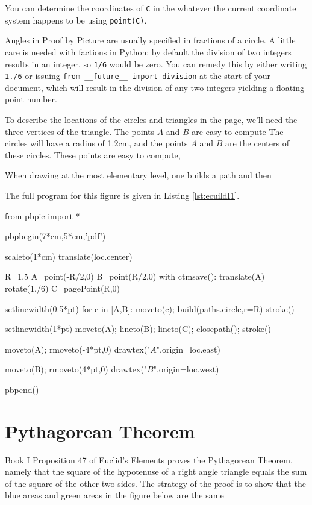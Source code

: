 \documentclass[12pt]{article}
\def\code#1{{\tt #1}}
\begin{document}
You
can determine the coordinates of \code{C} in the whatever the current
coordinate system happens to be using \code{point(C)}.

Angles in Proof by Picture
are usually specified in fractions of a circle.  A little care is needed
with factions in Python: by default the division of two integers results
in an integer, so \code{1/6} would be zero.  You can remedy this by
either writing \code{1./6} or issuing \code{from \_\_future\_\_ import division}
at the start of your document, which will result in the division of
any two integers yielding a floating point number. 

 
To describe the locations of the circles and triangles in the page, we'll 
need the three vertices of the triangle.  The points $A$ and $B$ are easy
to compute
The circles will have a radius
of 1.2cm, and the points $A$ and $B$ are the centers of these circles.
These points are easy to compute, 

When drawing at
the most elementary level, one builds a path and then 



The full program for this figure is given in Listing \ref{lst:ecuildI1}.

\begin{snippet}
from pbpic import *

pbpbegin(7*cm,5*cm,'pdf')

scaleto(1*cm)
translate(loc.center)

R=1.5
A=point(-R/2,0)
B=point(R/2,0)
with ctmsave():
  translate(A)
  rotate(1./6)
  C=pagePoint(R,0)

setlinewidth(0.5*pt)
for c in [A,B]:
  moveto(c); build(paths.circle,r=R)
  stroke()

setlinewidth(1*pt)
moveto(A); lineto(B); lineto(C); closepath();
stroke()

moveto(A); rmoveto(-4*pt,0)
drawtex("$A$",origin=loc.east)

moveto(B); rmoveto(4*pt,0)
drawtex("$B$",origin=loc.west)

pbpend()
\end{snippet}

\section{Pythagorean Theorem}

Book I Proposition 47 of Euclid's Elements proves the Pythagorean Theorem,
namely that the square of the hypotenuse of a right angle 
triangle equals the sum of the square of the other two sides.
The strategy of the proof is to show that the blue areas
and green areas in the figure below are the same
\end{document}
